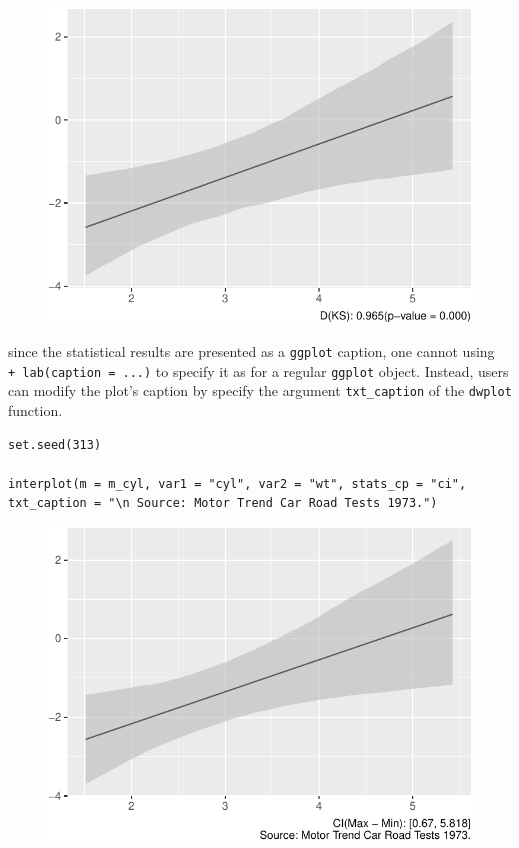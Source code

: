 \documentclass[
  article]{jss}
\begin{document}
\begin{figure}[H]

{\centering \includegraphics{jss_manuscript_files/figure-pdf/unnamed-chunk-15-1.pdf}

}

\end{figure}

since the statistical results are presented as a \texttt{ggplot}
caption, one cannot using \texttt{+\ lab(caption\ =\ ...)} to specify it
as for a regular \texttt{ggplot} object. Instead, users can modify the
plot's caption by specify the argument \texttt{txt\_caption} of the
\texttt{dwplot} function.

\begin{verbatim}
set.seed(313)

interplot(m = m_cyl, var1 = "cyl", var2 = "wt", stats_cp = "ci", txt_caption = "\n Source: Motor Trend Car Road Tests 1973.")
\end{verbatim}

\begin{figure}[H]

{\centering \includegraphics{jss_manuscript_files/figure-pdf/unnamed-chunk-16-1.pdf}

}

\end{figure}
\end{document}
